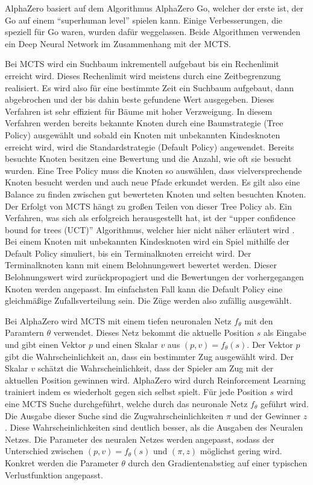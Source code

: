 AlphaZero basiert auf dem Algorithmus AlphaZero Go, welcher der erste ist, der Go auf einem \enquote{superhuman level}\cite{silver_mastering_2017-1} spielen kann. Einige Verbesserungen, die speziell für Go waren, wurden dafür weggelassen.\cite{silver_mastering_2017} Beide Algorithmen verwenden ein Deep Neural Network im Zusammenhang mit der \ac{MCTS}.

Bei \ac{MCTS} wird ein Suchbaum inkrementell aufgebaut bis ein Rechenlimit erreicht wird. Dieses Rechenlimit wird meistens durch eine Zeitbegrenzung realisiert. Es wird also für eine bestimmte Zeit ein Suchbaum aufgebaut, dann abgebrochen und der bis dahin beste gefundene Wert ausgegeben. Dieses Verfahren ist sehr effizient für Bäume mit hoher Verzweigung. In diesem Verfahren werden bereits bekannte Knoten durch eine Baumstrategie (Tree Policy) ausgewählt und sobald ein Knoten mit unbekannten Kindesknoten erreicht wird, wird die Standardstrategie (Default Policy) angewendet. Bereits besuchte Knoten besitzen eine Bewertung und die Anzahl, wie oft sie besucht wurden. Eine Tree Policy muss die Knoten so auswählen, dass vielversprechende Knoten besucht werden und auch neue Pfade erkundet werden. Es gilt also eine Balance zu finden zwischen gut bewerteten Knoten und selten besuchten Knoten. Der Erfolgt von \ac{MCTS} hängt zu großen Teilen von dieser Tree Policy ab. Ein Verfahren, was sich als erfolgreich herausgestellt hat, ist der \enquote{upper confidence bound for trees (UCT)} Algorithmus, welcher hier nicht näher erläutert wird \cite{browne_survey_2012}. Bei einem Knoten mit unbekannten Kindesknoten wird ein Spiel mithilfe der Default Policy simuliert, bis ein Terminalknoten erreicht wird. Der Terminalknoten kann mit einem Belohnungswert bewertet werden. Dieser Belohnungswert wird zurückpropagiert und die Bewertungen der vorhergegangen Knoten werden angepasst. Im einfachsten Fall kann die Default Policy eine gleichmäßige Zufallsverteilung sein. Die Züge werden also zufällig ausgewählt.
\cite{browne_survey_2012}

Bei AlphaZero wird \ac{MCTS} mit einem tiefen neuronalen Netz $f_\theta$ mit den Paramtern $\theta$ verwendet. Dieses Netz bekommt die aktuelle Position $s$ als Eingabe und gibt einen Vektor $p$ und einen Skalar $v$ aus $(p, v) = f_\theta(s)$. Der Vektor $p$ gibt die Wahrscheinlichkeit an, dass ein bestimmter Zug ausgewählt wird. Der Skalar $v$ schätzt die Wahrscheinlichkeit, dass der Spieler am Zug mit der aktuellen Position gewinnen wird. AlphaZero wird durch Reinforcement Learning trainiert indem es wiederholt gegen sich selbst spielt. Für jede Position $s$ wird eine \ac{MCTS} Suche durchgeführt, welche durch das neuronale Netz $f_\theta$ geführt wird. Die Ausgabe dieser Suche sind die Zugwahrscheinlichkeiten $\pi$ und der Gewinner $z$. Diese Wahrscheinlichkeiten sind deutlich besser, als die Ausgaben des Neuralen Netzes. Die Parameter des neuralen Netzes werden angepasst, sodass der Unterschied zwischen $(p, v) = f_\theta(s)$ und $(\pi, z)$ möglichst gering wird. Konkret werden die Parameter $\theta$ durch den Gradientenabstieg auf einer typischen Verlustfunktion angepasst.
\cite{silver_mastering_2017-1,silver_mastering_2017}

